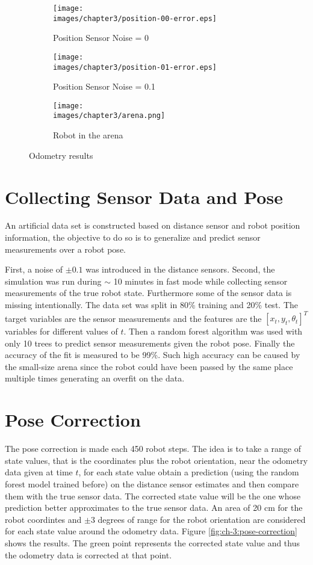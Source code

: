 \begin{figure}[h!]
  \centering
  \begin{subfigure}[b]{0.47\linewidth}
  	\texttt{[image: \\images/chapter3/position-00-error.eps]}
	\caption{Position Sensor Noise = 0}
  	\label{fig:ch-3:noise-0}
  \end{subfigure}
  \begin{subfigure}[b]{0.47\linewidth}
  	\texttt{[image: \\images/chapter3/position-01-error.eps]}
	\caption{Position Sensor Noise = 0.1}
  	\label{fig:ch-3:noise-1}
  \end{subfigure}
  \begin{subfigure}[b]{0.6\linewidth}
  	\texttt{[image: \\images/chapter3/arena.png]}
	\caption{Robot in the arena}
  	\label{fig:ch-3:arena}
  \end{subfigure}
  \caption{Odometry results}
  \label{fig:ch-3:odometry-res}
\end{figure}

\section{Collecting Sensor Data and Pose}

An artificial data set is constructed based on distance sensor and robot position information, the objective to do so is to generalize and predict sensor measurements over a robot pose.

First, a noise of $\pm0.1$ was introduced in the distance sensors. Second, the simulation was run during $\sim$ 10 minutes in fast mode while collecting sensor measurements of the true robot state. Furthermore some of the sensor data is missing intentionally. The data set was split in 80\% training and 20\% test. The target variables are the sensor measurements and the features are the $[x_t, y_t, \theta_t]^T$ variables for different values of $t$.  Then a random forest algorithm was used with only 10 trees to predict sensor measurements given the robot pose. Finally the accuracy of the fit is measured to be 99\%. Such high accuracy can be caused by the small-size arena since the robot could have been passed by the same place multiple times generating an overfit on the data.

\section{Pose Correction}

The pose correction is made each 450 robot steps. The idea is to take a range of state values, that is the coordinates plus the robot orientation, near the odometry data given at time $t$, for each state value obtain a prediction (using the random forest model trained before) on the distance sensor estimates and then compare them with the true sensor data. The corrected state value will be the one whose prediction better approximates to the true sensor data. An area of 20 cm for the robot coordintes and $\pm3$ degrees of range for the robot orientation are considered for each state value around the odometry data.  Figure \ref{fig:ch-3:pose-correction} shows the results. The green point represents the corrected state value and thus the odometry data is corrected at that point.

